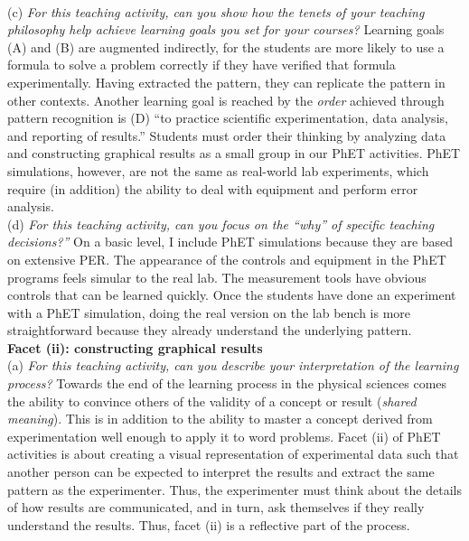\documentclass[../../../main.tex]{subfiles}
\begin{document}
\\
\vspace{0.25cm}
(c) \textit{For this teaching activity, can you show how the tenets of your teaching philosophy help achieve learning goals you
set for your courses?}  Learning goals (A) and (B) are augmented indirectly, for the students are more likely to use a formula to solve a problem correctly if they have verified that formula experimentally.  Having extracted the pattern, they can replicate the pattern in other contexts.  Another learning goal is reached by the \textit{order} achieved through pattern recognition is (D) ``to practice scientific experimentation, data analysis, and reporting of results.''  Students must order their thinking by analyzing data and constructing graphical results as a small group in our PhET activities.  PhET simulations, however, are not the same as real-world lab experiments, which require (in addition) the ability to deal with equipment and perform error analysis.
\\
\vspace{0.25cm}
(d) \textit{For this teaching activity, can you focus on the ``why'' of specific teaching decisions?''}  On a basic level, I include PhET simulations because they are based on extensive PER.  The appearance of the controls and equipment in the PhET programs feels simular to the real lab.  The measurement tools have obvious controls that can be learned quickly.  Once the students have done an experiment with a PhET simulation, doing the real version on the lab bench is more straightforward because they already understand the underlying pattern.
\\
\vspace{0.25cm}
\textbf{Facet (ii): constructing graphical results}
\\
\vspace{0.25cm}
(a) \textit{For this teaching activity, can you describe your interpretation of the learning process?} Towards the end of the learning process in the physical sciences comes the ability to convince others of the validity of a concept or result (\textit{shared meaning}).  This is in addition to the ability to master a concept derived from experimentation well enough to apply it to word problems.  Facet (ii) of PhET activities is about creating a visual representation of experimental data such that another person can be expected to interpret the results and extract the same pattern as the experimenter.  Thus, the experimenter must think about the details of how results are communicated, and in turn, ask themselves if they really understand the results.  Thus, facet (ii) is a reflective part of the process.
\end{document}
